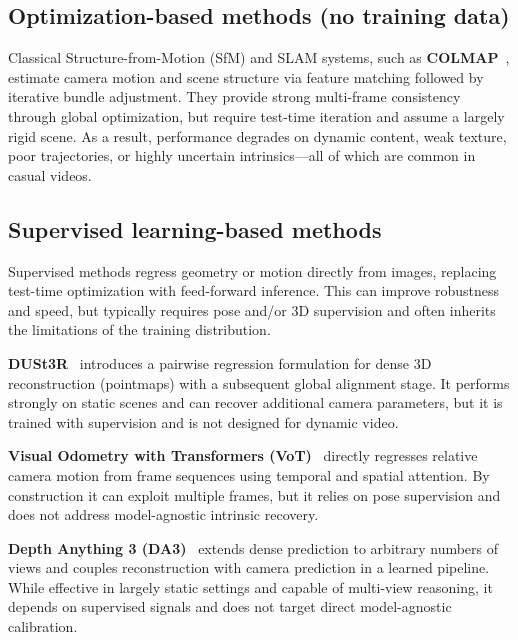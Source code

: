 
\subsection{Optimization-based methods (no training data)}
\label{sec:rw_optimization}
Classical Structure-from-Motion (SfM) and SLAM systems, such as \textbf{COLMAP}~\parencite{schonberger2016structure}, estimate camera motion and scene structure via feature matching followed by iterative bundle adjustment. They provide strong multi-frame consistency through global optimization, but require test-time iteration and assume a largely rigid scene. As a result, performance degrades on dynamic content, weak texture, poor trajectories, or highly uncertain intrinsics---all of which are common in casual videos.

\subsection{Supervised learning-based methods}
\label{sec:rw_supervised}
Supervised methods regress geometry or motion directly from images, replacing test-time optimization with feed-forward inference. This can improve robustness and speed, but typically requires pose and/or 3D supervision and often inherits the limitations of the training distribution.

\textbf{DUSt3R}~\parencite{wang2024dust3r} introduces a pairwise regression formulation for dense 3D reconstruction (pointmaps) with a subsequent global alignment stage. It performs strongly on static scenes and can recover additional camera parameters, but it is trained with supervision and is not designed for dynamic video.

\textbf{Visual Odometry with Transformers (VoT)}~\parencite{yugay2025vot} directly regresses relative camera motion from frame sequences using temporal and spatial attention. By construction it can exploit multiple frames, but it relies on pose supervision and does not address model-agnostic intrinsic recovery.

\textbf{Depth Anything 3 (DA3)}~\parencite{lin2025depth} extends dense prediction to arbitrary numbers of views and couples reconstruction with camera prediction in a learned pipeline. While effective in largely static settings and capable of multi-view reasoning, it depends on supervised signals and does not target direct model-agnostic calibration.

